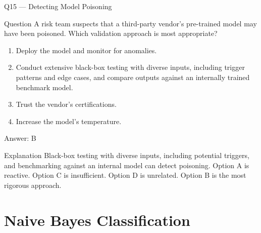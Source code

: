 \documentclass[aspectratio=169,8pt]{beamer}
\begin{document}
	\begin{frame}{Q15 --- Detecting Model Poisoning}
		\begin{block}{Question}
			A risk team suspects that a third-party vendor's pre-trained model may have been poisoned. Which validation approach is most appropriate?
			\begin{enumerate}
				\item Deploy the model and monitor for anomalies.
				\item Conduct extensive black-box testing with diverse inputs, including trigger patterns and edge cases, and compare outputs against an internally trained benchmark model.
				\item Trust the vendor's certifications.
				\item Increase the model's temperature.
			\end{enumerate}
		\end{block}
		\begin{exampleblock}{Answer: B}\end{exampleblock}
		\begin{block}{Explanation}
			Black-box testing with diverse inputs, including potential triggers, and benchmarking against an internal model can detect poisoning. Option A is reactive. Option C is insufficient. Option D is unrelated. Option B is the most rigorous approach.
		\end{block}
	\end{frame}
	
	\section{Naive Bayes Classification}
	
\end{document}
